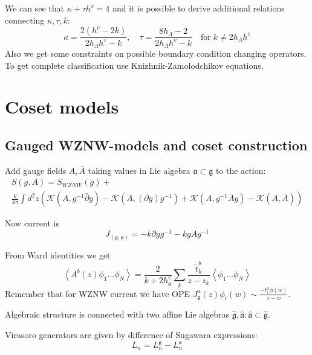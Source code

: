 \documentclass[12pt]{article}
\theoremstyle{definition}
\newcommand{\gf}{\mathfrak{g}}
\newcommand{\af}{\mathfrak{a}}
\newcommand{\gfh}{\hat{\mathfrak{g}}}
\newcommand{\afh}{\hat{\mathfrak{a}}}
\theoremstyle{definition} \newtheorem{Def}{Definition}
\begin{document}
We can see that $\kappa+\tau h^{v}=4$ and it is possible to derive additional relations connecting $\kappa, \tau, k$:
\begin{equation*}
  \kappa=\frac{2(h^{v}-2k)}{2h_{\Lambda}h^{v}-k},\quad \tau=\frac{8 h_{\Lambda}-2}{2h_{\Lambda}h^{v}-k}  \quad\text{for}\; k\neq 2h_{\Lambda}h^{v}
\end{equation*}
 Also we get some constraints on possible boundary condition changing operators. 
To get complete classification use Knizhnik-Zamolodchikov equations.


\section{Coset models}
\label{sec:coset-models}


\subsection{Gauged WZNW-models and coset construction}
Add gauge fields $A, \bar{A}$ taking values in Lie algebra $\af\subset \gf$ to the action:
\begin{multline*}
  S(g,A)=S_{WZNW}(g)+\\
  \frac{k}{4\pi}\int d^{2}z \left(\mathcal{K}(A, g^{-1}\bar \partial g)-\mathcal{K}(\bar A, (\partial g ) g^{-1})+\mathcal{K}(A,g^{-1}\bar A g)-\mathcal{K}(A,\bar A)\right)
\end{multline*}

Now current is
\begin{equation*}
  J_{(\gf,\af)}=-k\partial g g^{-1} -k g A g^{-1}
\end{equation*}

From Ward identities we get
\begin{equation*}
  \left< A^{b}(z)\phi_{1}\dots \phi_{N}\right>=\frac{2}{k+2 h^{v}_{\af}}\sum_{k}\frac{\tilde{t}^{b}_{k}}{z-z_{k}}\left<\phi_{1}\dots \phi_{N}\right>
\end{equation*}
Remember that for WZNW current we have OPE $J_{\gf}^{a}(z)\phi_{i}(w)\sim \frac{-t^{a}_{i}\phi(w)}{z-w}$.

Algebraic structure is connected with two affine Lie algebras $\gfh, \afh: \afh\subset\gfh$. 

Virasoro generators are given by difference of Sugawara expressions:
\begin{equation*}
  L_{n}=L_{n}^{\gf}-L_{n}^{\af}
\end{equation*}
\end{document}
